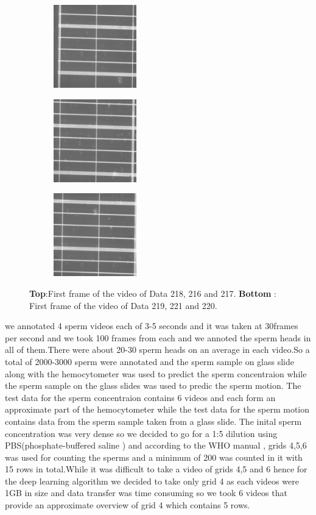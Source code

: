 \documentclass{article}
\begin{document}
\begin{figure}[H]
  \begin{subfigure}{3.6cm}
    \centering\includegraphics[width=3.6cm]{Data219_frame0.jpg}
  \end{subfigure}
  \begin{subfigure}{3.6cm}
    \centering\includegraphics[width=3.6cm]{Data221_frame0.jpg}
  \end{subfigure}
  \begin{subfigure}{3.6cm}
    \centering\includegraphics[width=3.6cm]{Data220_frame0.jpg}
  \end{subfigure}
  \caption{ 
  \textbf{Top}:First frame of the video of Data 218, 216 and 217.
  \textbf{Bottom} : First frame of the video of Data 219, 221 and 220.}
  \label{fig:cm_all}
\end{figure}

we annotated 4 sperm videos each of 3-5 seconds and it was taken at 30frames per second and we took 100 frames from each and we annoted the sperm heads in all of them.There were about 20-30 sperm heads on an average in each video.So a total of 
2000-3000 sperm were annotated and the sperm sample on glass slide along with the hemocytometer was used to predict the sperm concentraion while the sperm sample on the glass slides was used to predic the sperm motion.
The test data for the sperm concentraion contains 6 videos and each form an approximate part of the hemocytometer while the test data for the sperm motion contains data from the sperm sample taken from a glass slide.
The inital sperm concentration was very dense so we decided to go for a 1:5 dilution using PBS(phosphate-buffered saline ) and according to the WHO manual , grids 4,5,6 was used for counting the sperms and a minimum of 200 was counted in it with 15 rows in total.While it was difficult to take a video of grids 4,5 and 6 hence for the 
deep learning algorithm we decided to take only grid 4 as each videos were 1GB in size and data transfer was time consuming so we took 6 videos that provide an approximate overview of grid 4 which contains 5 rows.
\end{document}
